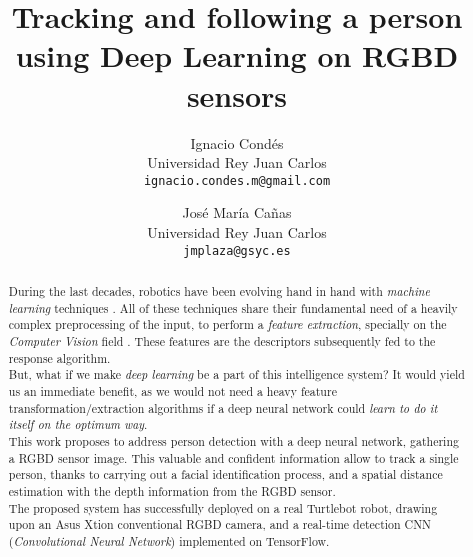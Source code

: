 \documentclass[11pt, a4paper]{article}
\title{Tracking and following a person using Deep Learning on RGBD sensors}
\author{Ignacio Condés \\
		Universidad Rey Juan Carlos \\
		\texttt{ignacio.condes.m@gmail.com} \and José María Cañas \\
		Universidad Rey Juan Carlos\\
		\texttt{jmplaza@gsyc.es}}
\begin{document}
	\maketitle
	
	\begin{abstract}
		During the last decades, robotics have been evolving hand in hand with \emph{machine learning} techniques \cite{speech-pattern-recognition} \cite{slam-feature-extraction}. All of these techniques share their fundamental need of a heavily complex preprocessing of the input, to perform a \emph{feature extraction}, specially on the \emph{Computer Vision}  field \cite[pp.~30--38]{slam-feature-extraction}. These features are the descriptors subsequently fed to the response algorithm.\\
		
		But, what if we make \emph{deep learning} be a part of this intelligence system? It would yield us an immediate benefit, as we would not need a heavy feature transformation/extraction algorithms if a deep neural network could \emph{learn to do it itself on the optimum way}.\\
		
		This work proposes to address person detection with a deep neural network, gathering  a RGBD sensor image. This valuable and confident information allow to track a single person, thanks to carrying out a facial identification process, and a spatial distance estimation with the depth information from the RGBD sensor.\\
		
		The proposed system has successfully deployed on a real Turtlebot robot, drawing upon an Asus Xtion conventional RGBD camera, and a real-time detection CNN (\emph{Convolutional Neural Network}) implemented on TensorFlow.
	\end{abstract}
	
	
	
	

	

	
	
	
\end{document}
